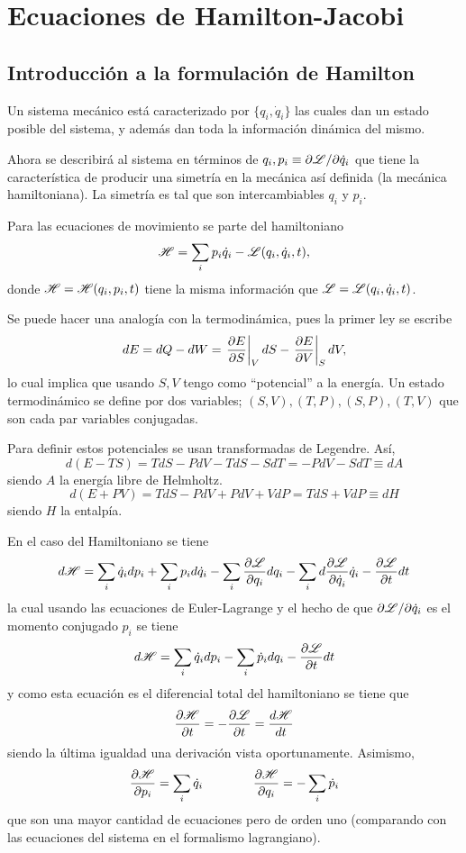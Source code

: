 \documentclass[10pt,oneside]{CBFT_book}
\begin{document}
\chapter{Ecuaciones de Hamilton-Jacobi}


\section{Introducción a la formulación de Hamilton}

Un sistema mecánico está caracterizado por $\{ q_i, \dot{q}_i \}$ las cuales dan un estado posible del sistema, y además
dan toda la información dinámica del mismo.

Ahora se describirá al sistema en términos de $ q_i, p_i \equiv \partial\mathscr{L}/\partial\dot{q}_i$  que tiene la característica
de producir una simetría en la mecánica así definida (la mecánica hamiltoniana).
La simetría es tal que son intercambiables $q_i$ y $p_i$.

Para las ecuaciones de movimiento se parte del hamiltoniano
\[
	\mathscr{H} = \sum_i p_i \dot{q}_i - \mathscr{L}( q_i, \dot{q}_i, t ),
\]
donde $\mathscr{H} =\mathscr{H}(q_i,p_i,t)$ tiene la misma información que $\mathscr{L}=\mathscr{L}(q_i,\dot{q}_i,t)$.

Se puede hacer una analogía con la termodinámica, pues la primer ley se escribe
\[
	dE = dQ - dW = \left. \frac{\partial^{\hspace{-0.05em}} {E}}{\partial {S}^{\hspace{-0.05em}}} \right|_V dS - \left. \frac{\partial^{\hspace{-0.05em}} {E}}{\partial {V}^{\hspace{-0.05em}}} \right|_S dV,
\]
lo cual implica que usando $S,V$ tengo como ``potencial'' a la energía.
Un estado termodinámico se define por dos variables; $(S,V), (T,P), (S,P), (T,V)$ que son cada par variables conjugadas.

Para definir estos potenciales se usan transformadas de Legendre. Así,
\[
	d(E-TS) = TdS -PdV - TdS -SdT = -PdV - SdT \equiv dA
\]
siendo $A$ la energía libre de Helmholtz.
\[
	d(E+PV) = TdS -PdV + PdV + VdP = TdS + VdP \equiv dH
\]
siendo $H$ la entalpía.

En el caso del Hamiltoniano se tiene 
\[
	d\mathscr{H} = \sum_i \dot{q}_i dp_i  + \sum_i p_i d\dot{q}_i - \sum_i \frac{\partial^{\hspace{-0.05em}} {\mathscr{L}}}{\partial {q_i}^{\hspace{-0.05em}}} dq_i -
	\sum_i d \frac{\partial^{\hspace{-0.05em}} {\mathscr{L}}}{\partial {\dot{q}_i}^{\hspace{-0.05em}}}\dot{q}_i - \frac{\partial^{\hspace{-0.05em}} {\mathscr{L}}}{\partial {t}^{\hspace{-0.05em}}}dt 
\]
la cual usando las ecuaciones de Euler-Lagrange y el hecho de que $\partial{\mathscr{L}}/\partial{\dot{q}_i} $ es el momento conjugado
$p_i$ se tiene 
\[
	d\mathscr{H} = \sum_i \dot{q}_i dp_i  - \sum_i \dot{p}_i dq_i - \frac{\partial^{\hspace{-0.05em}} {\mathscr{L}}}{\partial {t}^{\hspace{-0.05em}}}dt 
\]
y como esta ecuación es el diferencial total del hamiltoniano se tiene que
\[
	\frac{\partial^{\hspace{-0.05em}} {\mathscr{H}}}{\partial {t}^{\hspace{-0.05em}}} = -\frac{\partial^{\hspace{-0.05em}} {\mathscr{L}}}{\partial {t}^{\hspace{-0.05em}}} = \frac{d^{\hspace{-0.05em}} {\mathscr{H}}}{d {t}^{\hspace{-0.05em}}}
\]
siendo la última igualdad una derivación vista oportunamente. Asimismo,
\[
	\frac{\partial^{\hspace{-0.05em}} {\mathscr{H}}}{\partial {p_i}^{\hspace{-0.05em}}} = \sum_i \dot{q}_i \qquad \qquad 
	\frac{\partial^{\hspace{-0.05em}} {\mathscr{H}}}{\partial {q_i}^{\hspace{-0.05em}}} = -\sum_i \dot{p}_i
\]
que son una mayor cantidad de ecuaciones pero de orden uno (comparando con las ecuaciones del sistema en el formalismo 
lagrangiano).
\end{document}
